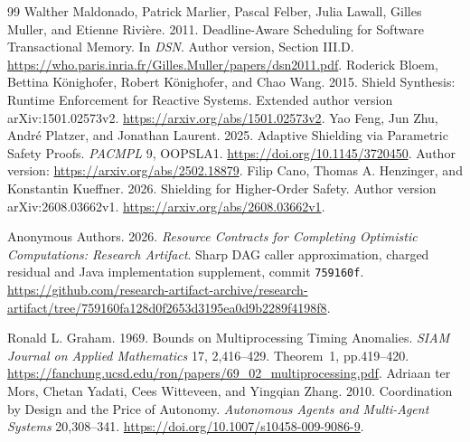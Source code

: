 \documentclass[acmsmall,screen,review,anonymous]{acmart}
\begin{document}
\begin{thebibliography}{99}
 Walther Maldonado, Patrick Marlier, Pascal Felber, Julia Lawall, Gilles Muller, and Etienne Rivi\`ere. 2011. Deadline-Aware Scheduling for Software Transactional Memory. In \emph{DSN}. Author version, Section III.D. \url{https://who.paris.inria.fr/Gilles.Muller/papers/dsn2011.pdf}.
 Roderick Bloem, Bettina K\"onighofer, Robert K\"onighofer, and Chao Wang. 2015. Shield Synthesis: Runtime Enforcement for Reactive Systems. Extended author version arXiv:1501.02573v2. \url{https://arxiv.org/abs/1501.02573v2}.
 Yao Feng, Jun Zhu, Andr\'e Platzer, and Jonathan Laurent. 2025. Adaptive Shielding via Parametric Safety Proofs. \emph{PACMPL} 9, OOPSLA1. \url{https://doi.org/10.1145/3720450}. Author version: \url{https://arxiv.org/abs/2502.18879}.
 Filip Cano, Thomas A. Henzinger, and Konstantin Kueffner. 2026. Shielding for Higher-Order Safety. Author version arXiv:2608.03662v1. \url{https://arxiv.org/abs/2608.03662v1}.

 Anonymous Authors. 2026. \emph{Resource Contracts for Completing Optimistic Computations: Research Artifact}. Sharp DAG caller approximation, charged residual and Java implementation supplement, commit \texttt{759160f}. \url{https://github.com/research-artifact-archive/research-artifact/tree/759160fa128d0f2653d3195ea0d9b2289f4198f8}.

 Ronald L. Graham. 1969. Bounds on Multiprocessing Timing Anomalies. \emph{SIAM Journal on Applied Mathematics} 17, 2,416--429. Theorem~1, pp.419--420. \url{https://fanchung.ucsd.edu/ron/papers/69_02_multiprocessing.pdf}.
 Adriaan ter Mors, Chetan Yadati, Cees Witteveen, and Yingqian Zhang. 2010. Coordination by Design and the Price of Autonomy. \emph{Autonomous Agents and Multi-Agent Systems} 20,308--341. \url{https://doi.org/10.1007/s10458-009-9086-9}.

\end{thebibliography}
\end{document}
